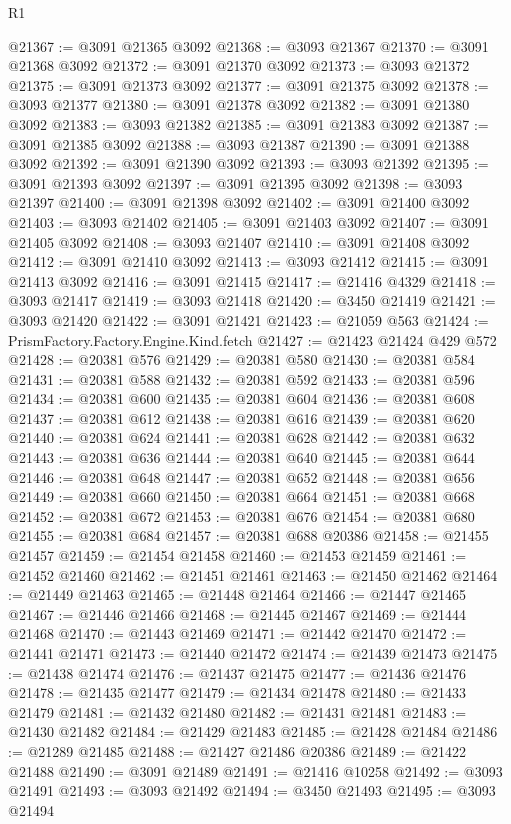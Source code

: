 \begin{lexlean}{R1}
\begin{coremodule}
@21367 := @3091 @21365 @3092
@21368 := @3093 @21367
@21370 := @3091 @21368 @3092
@21372 := @3091 @21370 @3092
@21373 := @3093 @21372
@21375 := @3091 @21373 @3092
@21377 := @3091 @21375 @3092
@21378 := @3093 @21377
@21380 := @3091 @21378 @3092
@21382 := @3091 @21380 @3092
@21383 := @3093 @21382
@21385 := @3091 @21383 @3092
@21387 := @3091 @21385 @3092
@21388 := @3093 @21387
@21390 := @3091 @21388 @3092
@21392 := @3091 @21390 @3092
@21393 := @3093 @21392
@21395 := @3091 @21393 @3092
@21397 := @3091 @21395 @3092
@21398 := @3093 @21397
@21400 := @3091 @21398 @3092
@21402 := @3091 @21400 @3092
@21403 := @3093 @21402
@21405 := @3091 @21403 @3092
@21407 := @3091 @21405 @3092
@21408 := @3093 @21407
@21410 := @3091 @21408 @3092
@21412 := @3091 @21410 @3092
@21413 := @3093 @21412
@21415 := @3091 @21413 @3092
@21416 := @3091 @21415
@21417 := @21416 @4329
@21418 := @3093 @21417
@21419 := @3093 @21418
@21420 := @3450 @21419
@21421 := @3093 @21420
@21422 := @3091 @21421
@21423 := @21059 @563
@21424 := PrismFactory.Factory.Engine.Kind.fetch
@21427 := @21423 @21424 @429 @572
@21428 := @20381 @576
@21429 := @20381 @580
@21430 := @20381 @584
@21431 := @20381 @588
@21432 := @20381 @592
@21433 := @20381 @596
@21434 := @20381 @600
@21435 := @20381 @604
@21436 := @20381 @608
@21437 := @20381 @612
@21438 := @20381 @616
@21439 := @20381 @620
@21440 := @20381 @624
@21441 := @20381 @628
@21442 := @20381 @632
@21443 := @20381 @636
@21444 := @20381 @640
@21445 := @20381 @644
@21446 := @20381 @648
@21447 := @20381 @652
@21448 := @20381 @656
@21449 := @20381 @660
@21450 := @20381 @664
@21451 := @20381 @668
@21452 := @20381 @672
@21453 := @20381 @676
@21454 := @20381 @680
@21455 := @20381 @684
@21457 := @20381 @688 @20386
@21458 := @21455 @21457
@21459 := @21454 @21458
@21460 := @21453 @21459
@21461 := @21452 @21460
@21462 := @21451 @21461
@21463 := @21450 @21462
@21464 := @21449 @21463
@21465 := @21448 @21464
@21466 := @21447 @21465
@21467 := @21446 @21466
@21468 := @21445 @21467
@21469 := @21444 @21468
@21470 := @21443 @21469
@21471 := @21442 @21470
@21472 := @21441 @21471
@21473 := @21440 @21472
@21474 := @21439 @21473
@21475 := @21438 @21474
@21476 := @21437 @21475
@21477 := @21436 @21476
@21478 := @21435 @21477
@21479 := @21434 @21478
@21480 := @21433 @21479
@21481 := @21432 @21480
@21482 := @21431 @21481
@21483 := @21430 @21482
@21484 := @21429 @21483
@21485 := @21428 @21484
@21486 := @21289 @21485
@21488 := @21427 @21486 @20386
@21489 := @21422 @21488
@21490 := @3091 @21489
@21491 := @21416 @10258
@21492 := @3093 @21491
@21493 := @3093 @21492
@21494 := @3450 @21493
@21495 := @3093 @21494

\end{coremodule}
\end{lexlean}
